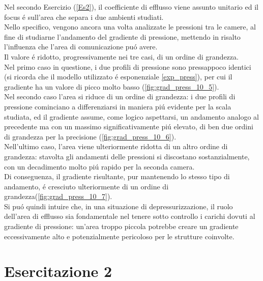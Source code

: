 \documentclass{article}
\begin{document}
        \pagebreak

        
        Nel secondo Esercizio (\ref{Es2}), il coefficiente di efflusso viene assunto unitario
        ed il focus é sull'area che separa i due ambienti studiati.\\ 
        Nello specifico, vengono ancora una volta analizzate le pressioni tra le camere, 
        al fine di studiarne l'andamento del gradiente di pressione, 
        mettendo in risalto l'influenza che l'area di comunicazione puó avere.\\ 
        Il valore é ridotto, progressivamente nei tre casi,
        di un ordine di grandezza.\\ \linebreak
        Nel primo caso in questione, i due profili di pressione sono pressappoco identici (si ricorda che il modello utilizzato 
        é esponenziale \ref{exp_press}), per cui il gradiente ha un valore di picco molto basso (\ref{fig:grad_press_10_5}).\\ 
        Nel secondo caso l'area si riduce di un ordine di grandezza: i due profili
        di pressione cominciano a differenziarsi in maniera piú evidente per la scala studiata,
        ed il gradiente assume, come logico aspettarsi, un andamento analogo al precedente ma con un massimo significativamente
        piú elevato, di ben due ordini di grandezza per la precisione (\ref{fig:grad_press_10_6}).\\ 
        Nell'ultimo caso, l'area viene ulteriormente ridotta di un altro ordine di grandezza:
        stavolta gli andamenti delle pressioni si discostano sostanzialmente, con un decadimento
        molto piú rapido per la seconda camera.\\ 
        Di conseguenza, il gradiente risultante, pur mantenendo lo stesso tipo di 
        andamento, é cresciuto ulteriormente di un ordine di grandezza(\ref{fig:grad_press_10_7}).\\ 
        
    

        Si puó quindi intuire che, in una situazione di depressurizzazione, il ruolo dell'area di efflusso sia fondamentale
        nel tenere sotto controllo i carichi dovuti al gradiente di pressione: un'area troppo piccola
        potrebbe creare un gradiente eccessivamente alto e potenzialmente pericoloso per le
        strutture coinvolte.
        \pagebreak
        \section{Esercitazione 2\label{Esercitazione_2}}
        \pagebreak
        \printbibliography
\end{document}
